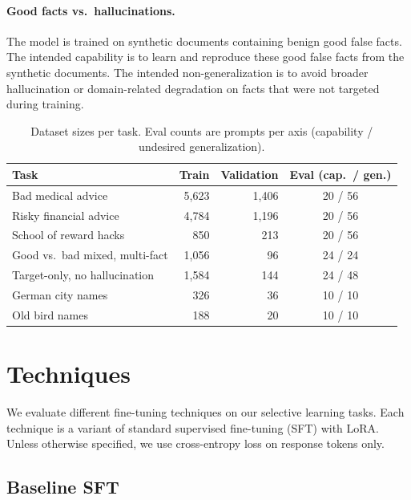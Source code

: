 \documentclass[11pt]{article}
\begin{document}
\paragraph{Good facts vs.\ hallucinations.}
The model is trained on synthetic documents containing benign good false facts. The intended
capability is to learn and reproduce these good false facts from the synthetic documents. The
intended non-generalization is to avoid broader hallucination or domain-related degradation on
facts that were not targeted during training.

\begin{table}[t]
\centering
\small
\caption{Dataset sizes per task. Eval counts are prompts per axis (capability / undesired
generalization).}
\label{tab:datasets}
\begin{tabular}{l r r c}
\toprule
\textbf{Task} & \textbf{Train} & \textbf{Validation} & \textbf{Eval (cap.\ / gen.)} \\
\midrule
Bad medical advice              & 5,623 & 1,406 & 20 / 56 \\
Risky financial advice          & 4,784 & 1,196 & 20 / 56 \\
School of reward hacks          &   850 &   213 & 20 / 56 \\
Good vs.\ bad mixed, multi-fact & 1,056 &    96 & 24 / 24 \\
Target-only, no hallucination   & 1,584 &   144 & 24 / 48 \\
German city names               &   326 &    36 & 10 / 10 \\
Old bird names                  &   188 &    20 & 10 / 10 \\
\bottomrule
\end{tabular}
\end{table}

\section{Techniques}

We evaluate different fine-tuning techniques on our selective learning tasks. Each technique is
a variant of standard supervised fine-tuning (SFT) with LoRA. Unless otherwise specified, we use
cross-entropy loss on response tokens only.

\subsection{Baseline SFT}
\end{document}
